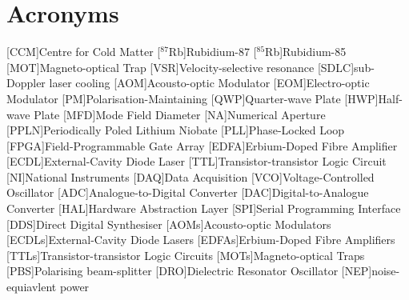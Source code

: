 \chapter*{Acronyms}
    \begin{acronym}
        [CCM]{Centre for Cold Matter}
        [\(^{87}\)Rb]{Rubidium-87}
        [\(^{85}\)Rb]{Rubidium-85}
        [MOT]{Magneto-optical Trap}
        [VSR]{Velocity-selective resonance}
        [SDLC]{sub-Doppler laser cooling}
        [AOM]{Acousto-optic Modulator}
        [EOM]{Electro-optic Modulator}
        [PM]{Polarisation-Maintaining}
        [QWP]{Quarter-wave Plate}
        [HWP]{Half-wave Plate}
        [MFD]{Mode Field Diameter}
        [NA]{Numerical Aperture}
        [PPLN]{Periodically Poled Lithium Niobate}
        [PLL]{Phase-Locked Loop}
        [FPGA]{Field-Programmable Gate Array}
        [EDFA]{Erbium-Doped Fibre Amplifier}
        [ECDL]{External-Cavity Diode Laser}
        [TTL]{Transistor-transistor Logic Circuit}
        [NI]{National Instruments}
        [DAQ]{Data Acquisition}
        [VCO]{Voltage-Controlled Oscillator}
        [ADC]{Analogue-to-Digital Converter}
        [DAC]{Digital-to-Analogue Converter}
        [HAL]{Hardware Abstraction Layer}
        [SPI]{Serial Programming Interface}
        [DDS]{Direct Digital Synthesiser}
        [AOMs]{Acousto-optic Modulators}
        [ECDLs]{External-Cavity Diode Lasers}
        [EDFAs]{Erbium-Doped Fibre Amplifiers}
        [TTLs]{Transistor-transistor Logic Circuits}
        [MOTs]{Magneto-optical Traps}
        [PBS]{Polarising beam-splitter}
        [DRO]{Dielectric Resonator Oscillator}
        [NEP]{noise-equiavlent power}
    \end{acronym}



